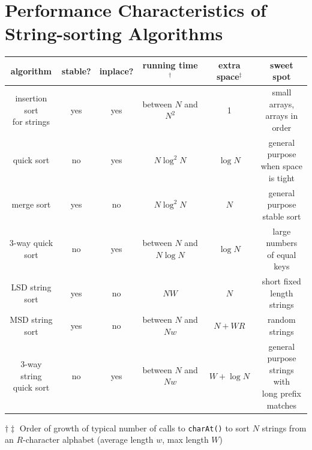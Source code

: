 \documentclass[8pt,a4paper,compress]{beamer}
\begin{document}
\section{Performance Characteristics of String-sorting Algorithms}
\begin{frame}[fragile]
\pause

\begin{center}
\begin{tabular}{cccccc}
algorithm & stable? & inplace? & running time$^\dagger$ & extra space$^\ddagger$ & sweet spot \\ \hline

\makecell{insertion sort \\ for strings} & yes & yes & \makecell{between \\ $N$ and $N^2$} & 1 & \makecell{small arrays, \\ arrays in order} \\

quick sort & no & yes & $N \log^2 N$ & $\log N$ & \makecell{general purpose \\ when space \\ is tight} \\

merge sort & yes & no & $N \log^2 N$ & $N$ & \makecell{general purpose \\ stable sort} \\

\makecell{3-way quick \\ sort} & no & yes & \makecell{between \\ $N$ and $N\log N$} & $\log N$ & \makecell{large numbers \\ of equal keys} \\

\makecell{LSD string \\ sort} & yes & no & $NW$ & $N$ & \makecell{short fixed \\ length strings} \\

\makecell{MSD string \\ sort} & yes & no & \makecell{between \\ $N$ and $Nw$} & $N + WR$ & random strings \\

\makecell{3-way string \\ quick sort} & no & yes & \makecell{between \\ $N$ and $Nw$} & $W + \log N$ & \makecell{general purpose \\ strings with \\ long prefix \\ matches}
\end{tabular} 

\bigskip

$\dagger \ddagger$ Order of growth of typical number of calls to \lstinline{charAt()} to sort $N$ strings from an $R$-character alphabet (average length $w$, max length $W$)
\end{center}
\end{frame}
\end{document}
